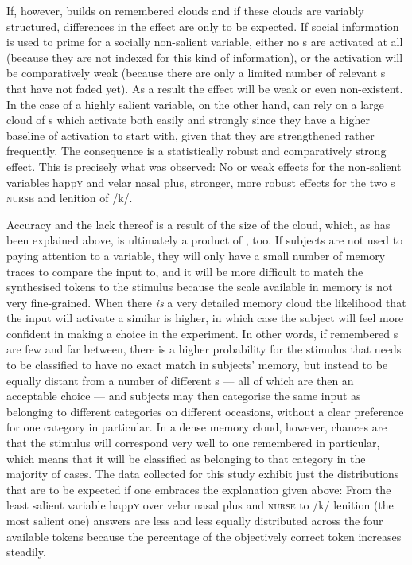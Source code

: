 If, however,  builds on remembered  clouds and if these clouds are variably structured, differences in the  effect are only to be expected.
If social information is used to prime for a socially non-salient variable, either no s are activated at all (because they are not indexed for this kind of information), or the activation will be comparatively weak (because there are only a limited number of relevant s that have not faded yet).
As a result the  effect will be weak or even non-existent.
In the case of a highly salient variable, on the other hand,  can rely on a large cloud of s which activate both easily and strongly since they have a higher baseline of activation to start with, given that they are strengthened rather frequently.
The consequence is a statistically robust and comparatively strong  effect.
This is precisely what was observed: No or weak  effects for the non-salient variables happ\textsc{y} and velar nasal plus, stronger, more robust  effects for the two s \textsc{nurse} and lenition of /k/.

Accuracy and the lack thereof is a result of the size of the  cloud, which, as has been explained above, is ultimately a product of , too.
If subjects are not used to paying attention to a variable, they will only have a small number of memory traces to compare the input to, and it will be more difficult to match the synthesised tokens to the stimulus because the scale available in memory is not very fine-grained.
When there \emph{is} a very detailed memory cloud the likelihood that the input will activate a similar  is higher, in which case the subject will feel more confident in making a choice in the experiment.
In other words, if remembered s are few and far between, there is a higher probability for the stimulus that needs to be classified to have no exact match in subjects' memory, but instead to be equally distant from a number of different s --- all of which are then an acceptable choice --- and subjects may then categorise the same input as belonging to different categories on different occasions, without a clear preference for one category in particular.
In a dense memory cloud, however, chances are that the stimulus will correspond very well to one remembered  in particular, which means that it will be classified as belonging to that category in the majority of cases.
The data collected for this study exhibit just the distributions that are to be expected if one embraces the explanation given above: From the least salient variable happ\textsc{y} over velar nasal plus and \textsc{nurse} to /k/ lenition (the most salient one) answers are less and less equally distributed across the four available tokens because the percentage of the objectively correct token increases steadily.

